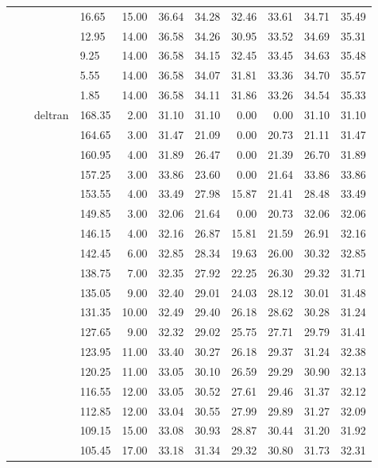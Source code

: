 \begin{longtable}{llllrrrrrrr}
   &  &  & 16.65 & 15.00 & 36.64 & 34.28 & 32.46 & 33.61 & 34.71 & 35.49 \\ 
   &  &  & 12.95 & 14.00 & 36.58 & 34.26 & 30.95 & 33.52 & 34.69 & 35.31 \\ 
   &  &  & 9.25 & 14.00 & 36.58 & 34.15 & 32.45 & 33.45 & 34.63 & 35.48 \\ 
   &  &  & 5.55 & 14.00 & 36.58 & 34.07 & 31.81 & 33.36 & 34.70 & 35.57 \\ 
   &  &  & 1.85 & 14.00 & 36.58 & 34.11 & 31.86 & 33.26 & 34.54 & 35.33 \\ 
   &  & deltran & 168.35 & 2.00 & 31.10 & 31.10 & 0.00 & 0.00 & 31.10 & 31.10 \\ 
   &  &  & 164.65 & 3.00 & 31.47 & 21.09 & 0.00 & 20.73 & 21.11 & 31.47 \\ 
   &  &  & 160.95 & 4.00 & 31.89 & 26.47 & 0.00 & 21.39 & 26.70 & 31.89 \\ 
   &  &  & 157.25 & 3.00 & 33.86 & 23.60 & 0.00 & 21.64 & 33.86 & 33.86 \\ 
   &  &  & 153.55 & 4.00 & 33.49 & 27.98 & 15.87 & 21.41 & 28.48 & 33.49 \\ 
   &  &  & 149.85 & 3.00 & 32.06 & 21.64 & 0.00 & 20.73 & 32.06 & 32.06 \\ 
   &  &  & 146.15 & 4.00 & 32.16 & 26.87 & 15.81 & 21.59 & 26.91 & 32.16 \\ 
   &  &  & 142.45 & 6.00 & 32.85 & 28.34 & 19.63 & 26.00 & 30.32 & 32.85 \\ 
   &  &  & 138.75 & 7.00 & 32.35 & 27.92 & 22.25 & 26.30 & 29.32 & 31.71 \\ 
   &  &  & 135.05 & 9.00 & 32.40 & 29.01 & 24.03 & 28.12 & 30.01 & 31.48 \\ 
   &  &  & 131.35 & 10.00 & 32.49 & 29.40 & 26.18 & 28.62 & 30.28 & 31.24 \\ 
   &  &  & 127.65 & 9.00 & 32.32 & 29.02 & 25.75 & 27.71 & 29.79 & 31.41 \\ 
   &  &  & 123.95 & 11.00 & 33.40 & 30.27 & 26.18 & 29.37 & 31.24 & 32.38 \\ 
   &  &  & 120.25 & 11.00 & 33.05 & 30.10 & 26.59 & 29.29 & 30.90 & 32.13 \\ 
   &  &  & 116.55 & 12.00 & 33.05 & 30.52 & 27.61 & 29.46 & 31.37 & 32.12 \\ 
   &  &  & 112.85 & 12.00 & 33.04 & 30.55 & 27.99 & 29.89 & 31.27 & 32.09 \\ 
   &  &  & 109.15 & 15.00 & 33.08 & 30.93 & 28.87 & 30.44 & 31.20 & 31.92 \\ 
   &  &  & 105.45 & 17.00 & 33.18 & 31.34 & 29.32 & 30.80 & 31.73 & 32.31 \\ 

\end{longtable}
